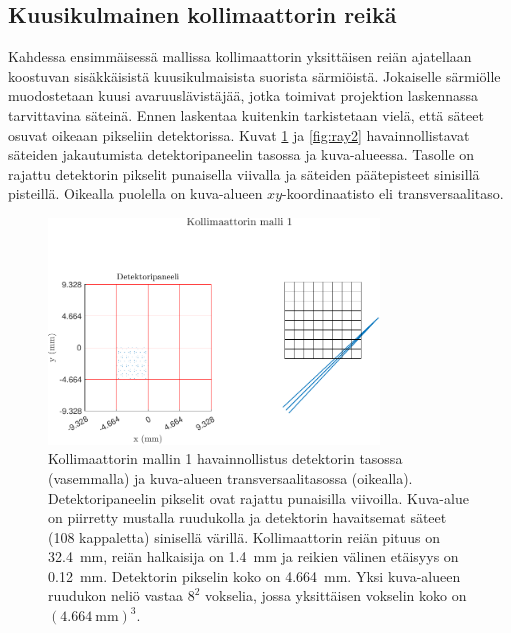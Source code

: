 \subsection{Kuusikulmainen kollimaattorin reikä}
Kahdessa ensimmäisessä mallissa kollimaattorin yksittäisen reiän ajatellaan koostuvan sisäkkäisistä kuusikulmaisista suorista särmiöistä. Jokaiselle särmiölle muodostetaan kuusi avaruuslävistäjää, jotka toimivat projektion laskennassa tarvittavina säteinä. Ennen laskentaa kuitenkin tarkistetaan vielä, että säteet osuvat oikeaan pikseliin detektorissa. Kuvat \ref{fig:ray1} ja \ref{fig:ray2} havainnollistavat säteiden jakautumista detektoripaneelin tasossa ja kuva-alueessa. Tasolle on rajattu detektorin pikselit punaisella viivalla ja säteiden päätepisteet sinisillä pisteillä. Oikealla puolella on kuva-alueen $xy$-koordinaatisto eli transversaalitaso.

\begin{figure}[H]
    \centering
    \captionsetup{width=.9\textwidth}
    \includegraphics[height=6cm]{kuvat/malli1.pdf}
    \caption{Kollimaattorin mallin 1 havainnollistus detektorin tasossa (vasemmalla) ja kuva-alueen transversaalitasossa (oikealla). Detektoripaneelin pikselit ovat rajattu punaisilla viivoilla. Kuva-alue on piirretty mustalla ruudukolla ja detektorin havaitsemat säteet (108 kappaletta) sinisellä värillä. Kollimaattorin reiän pituus on \qty{32.4}{\milli\meter}, reiän halkaisija on \qty{1.4}{\milli\meter} ja reikien välinen etäisyys on \qty{0.12}{\milli\meter}. Detektorin pikselin koko on \qty{4.664}{\milli\meter}. Yksi kuva-alueen ruudukon neliö vastaa $8^2$ vokselia, jossa yksittäisen vokselin koko on $(\qty{4.664}{\milli\meter})^{3}$.}
    \label{fig:ray1}
\end{figure}

